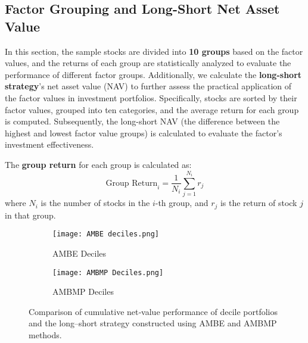 \documentclass[preprint,12pt,authoryear]{elsarticle}
\begin{document}
\begin{table}[ht]
  \centering
  \caption{Summary of Factor Performance Metrics}
  \label{tab:factor_performance}
\end{table}

\subsection{Factor Grouping and Long-Short Net Asset Value}
In this section, the sample stocks are divided into \textbf{10 groups} based on the factor values, and the returns of each group are statistically analyzed to evaluate the performance of different factor groups. Additionally, we calculate the \textbf{long-short strategy}'s net asset value (NAV) to further assess the practical application of the factor values in investment portfolios. Specifically, stocks are sorted by their factor values, grouped into ten categories, and the average return for each group is computed. Subsequently, the long-short NAV (the difference between the highest and lowest factor value groups) is calculated to evaluate the factor's investment effectiveness.

The \textbf{group return} for each group is calculated as:
\begin{equation}
    \text{Group Return}_i = \frac{1}{N_i} \sum_{j=1}^{N_i} r_j
\end{equation}
where \(N_i\) is the number of stocks in the \(i\)-th group, and \(r_j\) is the return of stock \(j\) in that group.

\begin{figure}[!htbp]
    \centering
    \begin{subfigure}[b]{0.49\linewidth}
        \centering
        \texttt{[image: AMBE deciles.png]}
        \caption{AMBE Deciles}
        \label{fig:ambe-deciles}
    \end{subfigure}
    \hfill
    \begin{subfigure}[b]{0.49\linewidth}
        \centering
        \texttt{[image: AMBMP Deciles.png]}
        \caption{AMBMP Deciles}
        \label{fig:ambmp-deciles}
    \end{subfigure}
    \caption{Comparison of cumulative net‐value performance of decile portfolios and the long–short strategy constructed using AMBE and AMBMP methods.}
    \label{fig:deciles-comparison}
\end{figure}
\end{document}
